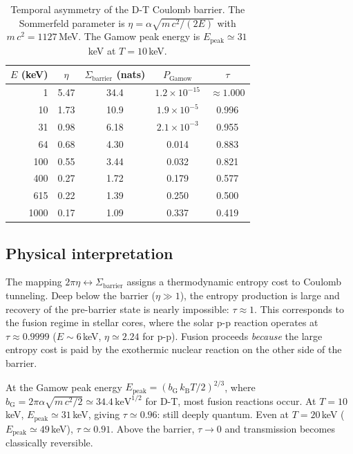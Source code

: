 \documentclass[prc,twocolumn,superscriptaddress,longbibliography,floatfix]{revtex4-2}
\newcommand{\kB}{k_{\mathrm{B}}}
\newcommand{\tauasym}{\tau}
\newcommand{\PGam}{P_{\mathrm{Gamow}}}
\newcommand{\Sbar}{\Sigma_{\mathrm{barrier}}}
\newcommand{\Ep}{E_{\mathrm{peak}}}
\begin{document}
\begin{table}[b]
\caption{Temporal asymmetry of the D-T Coulomb barrier.  The Sommerfeld
  parameter is $\eta = \alpha\sqrt{m\,c^{2}/(2E)}$ with
  $m\,c^{2} = 1127\,$MeV.  The Gamow peak energy is
  $\Ep \simeq 31\,$keV at $T=10\,$keV.}
\label{tab:tau_values}
\begin{ruledtabular}
\begin{tabular}{rcccc}
$E$ (keV) & $\eta$ & $\Sbar$ (nats) & $\PGam$ & $\tauasym$\\
\midrule
1    & 5.47  & 34.4   & $1.2\times 10^{-15}$ & $\approx 1.000$\\
10   & 1.73  & 10.9   & $1.9\times 10^{-5}$  & 0.996\\
31   & 0.98  & 6.18   & $2.1\times 10^{-3}$  & 0.955\\
64   & 0.68  & 4.30   & 0.014               & 0.883\\
100  & 0.55  & 3.44   & 0.032                & 0.821\\
400  & 0.27  & 1.72   & 0.179                & 0.577\\
615  & 0.22  & 1.39   & 0.250                & 0.500\\
1000 & 0.17  & 1.09   & 0.337                & 0.419\\
\end{tabular}
\end{ruledtabular}
\end{table}

\subsection{Physical interpretation}

The mapping $2\pi\eta \leftrightarrow \Sbar$ assigns a
thermodynamic entropy cost to Coulomb tunneling.  Deep below the
barrier ($\eta \gg 1$), the entropy production is large and recovery of
the pre-barrier state is nearly impossible:
$\tauasym \approx 1$.  This corresponds to the fusion regime in stellar
cores, where the solar p-p reaction operates at
$\tauasym \approx 0.9999$ ($E\sim 6\,$keV, $\eta \simeq 2.24$ for p-p).
Fusion proceeds
\emph{because} the large entropy cost is paid by the exothermic nuclear
reaction on the other side of the barrier.

At the Gamow peak energy
$\Ep = (b_{\mathrm{G}}\,\kB T/2)^{2/3}$,
where $b_{\mathrm{G}} = 2\pi\alpha\sqrt{m\,c^{2}/2}
\simeq 34.4\,\mathrm{keV}^{1/2}$ for D-T,
most fusion reactions occur.  At $T = 10\,$keV, $\Ep \simeq 31\,$keV,
giving $\tauasym \simeq 0.96$: still deeply quantum.
Even at $T = 20\,$keV ($\Ep \simeq 49\,$keV), $\tauasym \simeq 0.91$.
Above the barrier, $\tauasym \to 0$ and transmission becomes
classically reversible.
\end{document}
